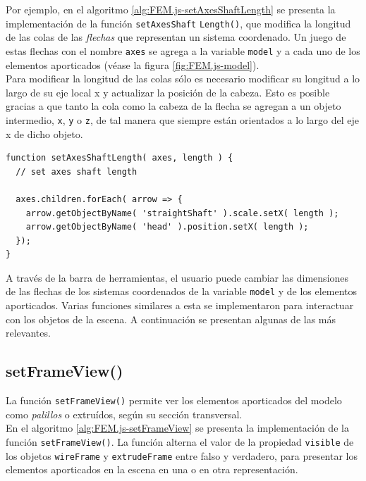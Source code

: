 Por ejemplo, en el algoritmo \ref{alg:FEM.js-setAxesShaftLength} se presenta la implementación de la función \verb|setAxesShaft| \verb|Length()|, que modifica la longitud de las colas de las \emph{flechas} que representan un sistema coordenado. Un juego de estas flechas con el nombre \verb|axes| se agrega a la variable \verb|model| y a cada uno de los elementos aporticados (véase la figura \ref{fig:FEM.js-model}).\\

Para modificar la longitud de las colas sólo es necesario modificar su longitud a lo largo de su eje local x y actualizar la posición de la cabeza. Esto es posible gracias a que tanto la cola como la cabeza de la flecha se agregan a un objeto intermedio, \verb|x|, \verb|y| o \verb|z|, de tal manera que siempre están orientados a lo largo del eje x de dicho objeto.\\

\begin{lstlisting}[language={},caption=Implementación de la función \texttt{setAxesShaftLength()} del archivo \texttt{FEM.js}.,label=alg:FEM.js-setAxesShaftLength,frame=single]
function setAxesShaftLength( axes, length ) {
  // set axes shaft length

  axes.children.forEach( arrow => { 
    arrow.getObjectByName( 'straightShaft' ).scale.setX( length );
    arrow.getObjectByName( 'head' ).position.setX( length );
  });
}  
\end{lstlisting}
\bigskip

A través de la barra de herramientas, el usuario puede cambiar las dimensiones de las flechas de los sistemas coordenados de la variable \verb|model| y de los elementos aporticados. Varias funciones similares a esta se implementaron para interactuar con los objetos de la escena. A continuación se presentan algunas de las más relevantes.\\

\subsection{setFrameView()}

La función \verb|setFrameView()| permite ver los elementos aporticados del modelo como \emph{palillos} o extruídos, según su sección transversal.\\

En el algoritmo \ref{alg:FEM.js-setFrameView} se presenta la implementación de la función \verb|setFrameView()|. La función alterna el valor de la propiedad \verb|visible| de los objetos \verb|wireFrame| y \verb|extrudeFrame| entre falso y verdadero, para presentar los elementos aporticados en la escena en una o en otra representación.\\

